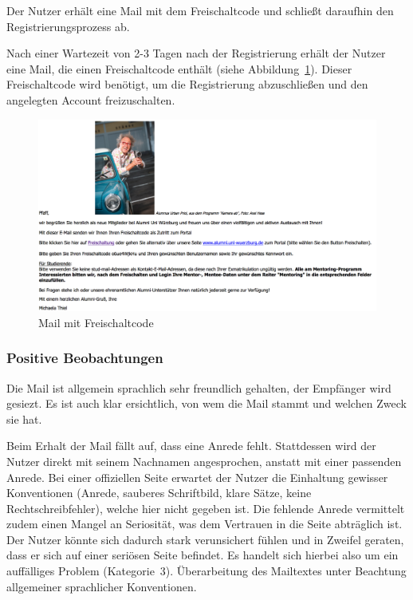 \newpage
{}
\label{subsec:freischaltung}
Der Nutzer erhält eine Mail mit dem Freischaltcode und schließt daraufhin den Registrierungsprozess ab.

Nach einer Wartezeit von 2-3 Tagen nach der Registrierung erhält der Nutzer eine Mail, die einen Freischaltcode enthält (siehe Abbildung~\ref{fig:regmail}). Dieser Freischaltcode wird benötigt, um die Registrierung abzuschließen und den angelegten Account freizuschalten.

\begin{figure}
	\centering
		\includegraphics[width=\textwidth]{figures/regmail.jpg}
	\caption{Mail mit Freischaltcode}
	\label{fig:regmail}
\end{figure}

\subsubsection*{Positive Beobachtungen}
\label{subsubsec:freischaltung_mail_positiv}
Die Mail ist allgemein sprachlich sehr freundlich gehalten, der Empfänger wird gesiezt. Es ist auch klar ersichtlich, von wem die Mail stammt und welchen Zweck sie hat.

{
Beim Erhalt der Mail fällt auf, dass eine Anrede fehlt. Stattdessen wird der Nutzer direkt mit seinem Nachnamen angesprochen, anstatt mit einer passenden Anrede.
}
{
Bei einer offiziellen Seite erwartet der Nutzer die Einhaltung gewisser Konventionen (Anrede, sauberes Schriftbild, klare Sätze, keine Rechtschreibfehler), welche hier nicht gegeben ist. Die fehlende Anrede vermittelt zudem einen Mangel an Seriosität, was dem Vertrauen in die Seite abträglich ist. Der Nutzer könnte sich dadurch stark verunsichert fühlen und in Zweifel geraten, dass er sich auf einer seriösen Seite befindet. Es handelt sich hierbei also um ein auffälliges Problem (Kategorie~3).
}
{
Überarbeitung des Mailtextes unter Beachtung allgemeiner sprachlicher Konventionen.
}
\label{prob:frei:mailanrede}

